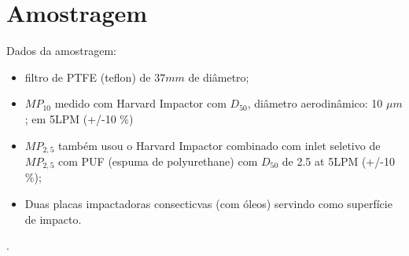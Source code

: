 \section{Amostragem}

Dados da amostragem:
\begin{itemize}
  \item filtro de PTFE (teflon) de $37mm$ de diâmetro;
  \item $MP_{10}$ medido com Harvard Impactor com $D_50$, diâmetro 
        aerodinâmico: 10 $\mu m$;
em 5LPM (+/-10 \%)
  \item $MP_{2,5}$ também usou o Harvard Impactor combinado com inlet 
         seletivo de $MP_{2,5}$ com PUF (espuma de polyurethane) com $D_50$ 
          de 2.5 at 5LPM (+/-10 \%);
  \item Duas placas impactadoras consecticvas (com óleos) servindo como 
        superfície de impacto.
\end{itemize}




.




